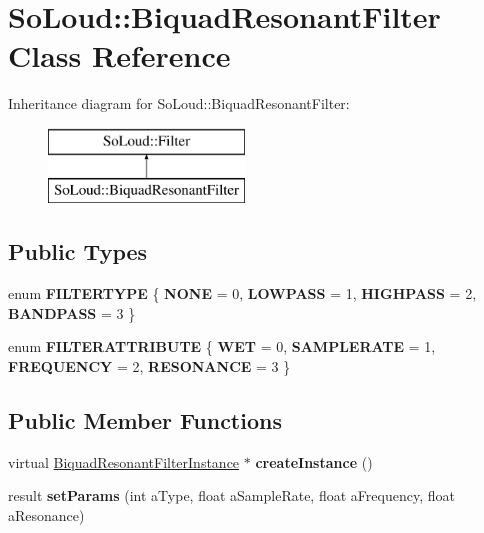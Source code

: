 \hypertarget{class_so_loud_1_1_biquad_resonant_filter}{}\section{So\+Loud\+:\+:Biquad\+Resonant\+Filter Class Reference}
\label{class_so_loud_1_1_biquad_resonant_filter}
Inheritance diagram for So\+Loud\+:\+:Biquad\+Resonant\+Filter\+:\begin{figure}[H]
\begin{center}
\leavevmode
\includegraphics[height=2.000000cm]{class_so_loud_1_1_biquad_resonant_filter}
\end{center}
\end{figure}
\subsection*{Public Types}
\begin{DoxyCompactItemize}
\item 
\mbox{\label{class_so_loud_1_1_biquad_resonant_filter_a0f24bc97c3d6f6eb215be8e44c484071}} 
enum {\bfseries F\+I\+L\+T\+E\+R\+T\+Y\+PE} \{ {\bfseries N\+O\+NE} = 0, 
{\bfseries L\+O\+W\+P\+A\+SS} = 1, 
{\bfseries H\+I\+G\+H\+P\+A\+SS} = 2, 
{\bfseries B\+A\+N\+D\+P\+A\+SS} = 3
 \}
\item 
\mbox{\label{class_so_loud_1_1_biquad_resonant_filter_a50ed3775c10fd396de47dfd0df63f09d}} 
enum {\bfseries F\+I\+L\+T\+E\+R\+A\+T\+T\+R\+I\+B\+U\+TE} \{ {\bfseries W\+ET} = 0, 
{\bfseries S\+A\+M\+P\+L\+E\+R\+A\+TE} = 1, 
{\bfseries F\+R\+E\+Q\+U\+E\+N\+CY} = 2, 
{\bfseries R\+E\+S\+O\+N\+A\+N\+CE} = 3
 \}
\end{DoxyCompactItemize}
\subsection*{Public Member Functions}
\begin{DoxyCompactItemize}
\item 
\mbox{\label{class_so_loud_1_1_biquad_resonant_filter_aebe5dbf06e16fcc56eab973d12dc3eaa}} 
virtual \mbox{\hyperlink{class_so_loud_1_1_biquad_resonant_filter_instance}{Biquad\+Resonant\+Filter\+Instance}} $\ast$ {\bfseries create\+Instance} ()
\item 
\mbox{\label{class_so_loud_1_1_biquad_resonant_filter_afb351a0c26dc8f56d4bc165d922c703b}} 
result {\bfseries set\+Params} (int a\+Type, float a\+Sample\+Rate, float a\+Frequency, float a\+Resonance)
\end{DoxyCompactItemize}
